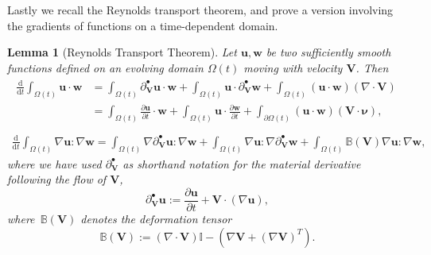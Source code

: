 \documentclass[a4paper]{amsart}
\numberwithin{equation}{section}
\newcommand{\ddt}[1]{\frac{\partial #1}{\partial t}}
\newcommand{\matdev}{\partial^{\bullet}}
\newcommand{\grad}{\nabla}
\newcommand{\Div}{\nabla \cdot}
\theoremstyle{plain}
\newtheorem{lemma}[theorem]{Lemma}
\newcommand{\mbf}[1]{\mathbf{#1}}
\newcommand{\mbb}[1]{\mathbb{#1}}
\begin{document}
Lastly we recall the Reynolds transport theorem, and prove a version involving the gradients of functions on a time-dependent domain.
\begin{lemma}[Reynolds Transport Theorem]
\label{lemma: reynolds transport theorem}
Let $\mbf{u}, \mbf{w}$ be two sufficiently smooth functions defined on an evolving domain $\Omega(t)$ moving with velocity $\mbf{V}$.
Then
\begin{gather}
    \begin{split}\frac{\mathrm{d}}{\mathrm{d}t} \int_{\Omega(t)} \mbf{u} \cdot \mbf{w} &=\int_{\Omega(t)} \matdev_\mbf{V}{\mbf{u}} \cdot \mbf{w} + \int_{\Omega(t)} \mbf{u} \cdot \matdev_\mbf{V}{\mbf{w}} + \int_{\Omega(t)} (\mbf{u} \cdot \mbf{w}) (\Div \mbf{V})\\
    &= \int_{\Omega(t)} \ddt{\mbf{u}} \cdot \mbf{w} + \int_{\Omega(t)} \mbf{u} \cdot \ddt{\mbf{w}} + \int_{\partial\Omega(t)} (\mbf{u} \cdot \mbf{w}) (\mbf{V} \cdot \boldsymbol{\nu}),\\
    \end{split}\label{eqn: reynolds1}\\
    \frac{\mathrm{d}}{\mathrm{d}t} \int_{\Omega(t)} \grad\mbf{u} : \grad\mbf{w} = \int_{\Omega(t)} \grad\matdev_{\mbf{V}}{\mbf{u}} : \grad \mbf{w} + \int_{\Omega(t)} \grad \mbf{u} : \grad \matdev_{\mbf{V}}\mbf{w} + \int_{\Omega(t)} \mbb{B}(\mbf{V})\grad\mbf{u} : \grad\mbf{w}, \label{eqn: reynolds2}
\end{gather}
where we have used $\matdev_{\mbf{V}}$ as shorthand notation for the material derivative following the flow of $\mbf{V}$,
\[ \matdev_{\mbf{V}} \mbf{u} := \ddt{\mbf{u}} + \mbf{V} \cdot (\grad \mbf{u}), \]
where~$\mbb{B}(\mbf{V})$ denotes the deformation tensor
\[ \mbb{B}(\mbf{V}) := (\Div \mbf{V}) \mbb{I} - (\grad \mbf{V} + (\grad \mbf{V})^T). \]
\end{lemma}
\end{document}
